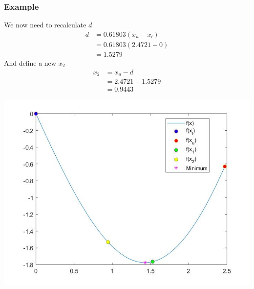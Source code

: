 \documentclass{if-beamer}
\begin{document}
\begin{frame}
	\frametitle{Example}
	
	\begin{minipage}{0.4\textwidth}
		We now need to recalculate $d$
		\begin{align*}
			d &= 0.61803(x_u - x_l)\\
			 &=0.61803(2.4721 - 0)\\
			 &= 1.5279
		\end{align*}
		And define a new $x_2$
		\begin{align*}
			x_2 &= x_u - d\\
			&= 2.4721- 1.5279\\
			&= 0.9443
		\end{align*}

	\end{minipage}
	\begin{minipage}{0.6\textwidth}
		\centering
		\includegraphics[width = 1.2\textwidth]{figures/iter2.jpg}
	\end{minipage}
\end{frame}
\end{document}
